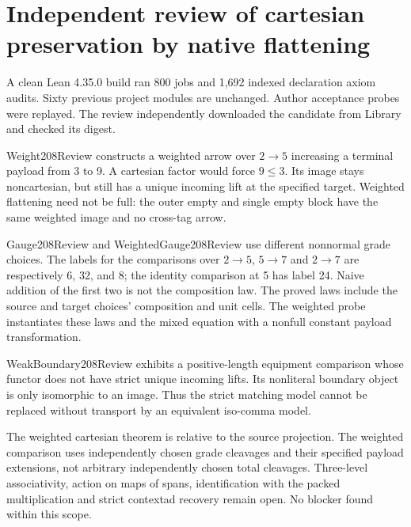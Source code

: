 \documentclass{article}
\begin{document}
\section*{Independent review of cartesian preservation by native flattening}
A clean Lean 4.35.0 build ran 800 jobs and 1,692 indexed declaration axiom audits. Sixty previous project modules are unchanged. Author acceptance probes were replayed. The review independently downloaded the candidate from Library and checked its digest.
\par Weight208Review constructs a weighted arrow over $2\to5$ increasing a terminal payload from 3 to 9. A cartesian factor would force $9\le3$. Its image stays noncartesian, but still has a unique incoming lift at the specified target. Weighted flattening need not be full: the outer empty and single empty block have the same weighted image and no cross-tag arrow.
\par Gauge208Review and WeightedGauge208Review use different nonnormal grade choices. The labels for the comparisons over $2\to5$, $5\to7$ and $2\to7$ are respectively 6, 32, and 8; the identity comparison at 5 has label 24. Naive addition of the first two is not the composition law. The proved laws include the source and target choices' composition and unit cells. The weighted probe instantiates these laws and the mixed equation with a nonfull constant payload transformation.
\par WeakBoundary208Review exhibits a positive-length equipment comparison whose functor does not have strict unique incoming lifts. Its nonliteral boundary object is only isomorphic to an image. Thus the strict matching model cannot be replaced without transport by an equivalent iso-comma model.
\par The weighted cartesian theorem is relative to the source projection. The weighted comparison uses independently chosen grade cleavages and their specified payload extensions, not arbitrary independently chosen total cleavages. Three-level associativity, action on maps of spans, identification with the packed multiplication and strict contextad recovery remain open. No blocker found within this scope.
\end{document}
